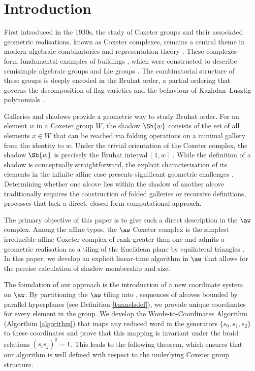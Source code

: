 \documentclass[11pt]{article}
\begin{document}
\section{Introduction}

First introduced in the 1930s, the study of Coxeter groups and their associated geometric realisations, known as Coxeter complexes, remains a central theme in modern algebraic combinatorics and representation theory \cite{COXETER,ABRAMENKOBROWN,RON}. These complexes form fundamental examples of buildings \cite{TITS1}, which were constructed to describe semisimple algebraic groups and Lie groups \cite{TITS}. The combinatorial structure of these groups is deeply encoded in the Bruhat order, a partial ordering that governs the decomposition of flag varieties and the behaviour of Kazhdan--Lusztig polynomials  \cite{KL}. 

Galleries and shadows provide a geometric way to study Bruhat order. For an element $w$ in a Coxeter group $W$, the shadow $\Sh{w}$ consists of the set of all elements $x \in W$ that can be reached via folding operations on a minimal gallery from the identity to $w$. Under the trivial orientation of the Coxeter complex, the shadow $\Sh{w}$ is precisely the Bruhat interval $[1, w]$ \cite{SHA}. While the definition of a shadow is conceptually straightforward, the explicit characterisation of its elements in the infinite affine case presents significant geometric challenges \cite{WILD}. Determining whether one alcove lies within the shadow of another alcove traditionally requires the construction of folded galleries or recursive definitions, processes that lack a direct, closed-form computational approach.

The primary objective of this paper is to give such a direct description in the $\aw$ complex. Among the affine types, the $\aw$ Coxeter complex is the simplest irreducible affine Coxeter complex of rank greater than one and admits a geometric realisation as a tiling of the Euclidean plane by equilateral triangles \cite{DAVIS}. In this paper, we develop an explicit linear-time algorithm in $\aw$ that allows for the precise calculation of shadow membership and size.

The foundation of our approach is the introduction of a new coordinate system on $\aw$. By partitioning the $\aw$ tiling into , sequences of alcoves bounded by parallel hyperplanes (see Definition \ref{tunnelsdef}), we provide unique coordinates for every element in the group. We develop the Words-to-Coordinates Algorithm (Algorthim \ref{algorithm}) that maps any reduced word in the generators $\{s_0, s_1, s_2\}$ to these coordinates and prove that this mapping is invariant under the braid relations $(s_i s_j)^3 = 1$. This leads to the following theorem, which ensures that our algorithm is well defined with respect to the underlying Coxeter group structure.
\end{document}
